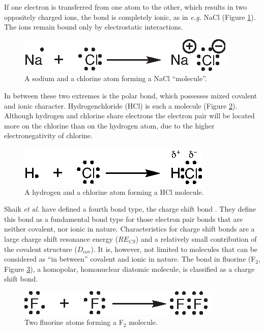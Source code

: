 If one electron is transferred from one atom to the other, which results in two oppositely charged ions, the bond is completely ionic, as in \textit{e.g.} NaCl (Figure \ref{ch3.fig.nacl}). The ions remain bound only by electrostatic interactions. 
\begin{figure}[ht]
\center
\includegraphics{dissociation/figures/nacl.eps}
\caption{A sodium and a chlorine atom forming a NaCl ``molecule''.}
\label{ch3.fig.nacl}
\end{figure}

In between these two extremes is the polar bond, which possesses mixed covalent and ionic character. Hydrogenchloride (HCl) is such a molecule (Figure \ref{ch3.fig.hcl}). Although hydrogen and chlorine share electrons the electron pair will be located more on the chlorine than on the hydrogen atom, due to the higher electronegativity of chlorine.
\begin{figure}[ht]
\center
\includegraphics{dissociation/figures/hcl.eps}
\caption{A hydrogen and a chlorine atom forming a HCl molecule.}
\label{ch3.fig.hcl}
\end{figure}

Shaik \textit{et al.} have defined a fourth bond type, the charge shift bond \cite{cs1,cs2}. They define this bond as a fundamental bond type for those electron pair bonds that are neither covalent, nor ionic in nature. Characteristics for charge shift bonds are a large charge shift resonance energy ($RE_{CS}$) and a relatively small contribution of the covalent structure ($D_\mathrm{cov}$). It is, however, not limited to molecules that can be considered as ``in between'' covalent and ionic in nature. The bond in fluorine (F$_2$, Figure \ref{ch3.fig.f_twee}), a homopolar, homonuclear diatomic molecule, is classified as a charge shift bond.
\begin{figure}[h]
\center
\includegraphics{dissociation/figures/f_twee.eps}
\caption{Two fluorine atoms forming a F$_2$ molecule.}
\label{ch3.fig.f_twee} 
\end{figure}


